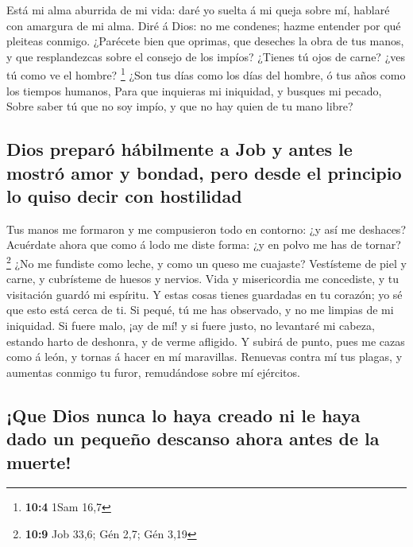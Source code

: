  Está mi alma aburrida de mi vida: daré yo suelta á mi queja
sobre mí, hablaré con amargura de mi alma.  Diré á Dios: no
me condenes; hazme entender por qué pleiteas conmigo. 
¿Parécete bien que oprimas, que deseches la obra de tus manos, y que
resplandezcas sobre el consejo de los impíos?  ¿Tienes tú
ojos de carne? ¿ves tú como ve el hombre? \footnote{\textbf{10:4} 1Sam
  16,7}  ¿Son tus días como los días del hombre, ó tus años
como los tiempos humanos,  Para que inquieras mi iniquidad,
y busques mi pecado,  Sobre saber tú que no soy impío, y que
no hay quien de tu mano libre?

\hypertarget{dios-preparuxf3-huxe1bilmente-a-job-y-antes-le-mostruxf3-amor-y-bondad-pero-desde-el-principio-lo-quiso-decir-con-hostilidad}{%
\subsection{Dios preparó hábilmente a Job y antes le mostró amor y
bondad, pero desde el principio lo quiso decir con
hostilidad}\label{dios-preparuxf3-huxe1bilmente-a-job-y-antes-le-mostruxf3-amor-y-bondad-pero-desde-el-principio-lo-quiso-decir-con-hostilidad}}

 Tus manos me formaron y me compusieron todo en contorno: ¿y
así me deshaces?  Acuérdate ahora que como á lodo me diste
forma: ¿y en polvo me has de tornar? \footnote{\textbf{10:9} Job 33,6;
  Gén 2,7; Gén 3,19}  ¿No me fundiste como leche, y como un
queso me cuajaste?  Vestísteme de piel y carne, y
cubrísteme de huesos y nervios.  Vida y misericordia me
concediste, y tu visitación guardó mi espíritu.  Y estas
cosas tienes guardadas en tu corazón; yo sé que esto está cerca de ti.
 Si pequé, tú me has observado, y no me limpias de mi
iniquidad.  Si fuere malo, ¡ay de mí! y si fuere justo, no
levantaré mi cabeza, estando harto de deshonra, y de verme afligido.
 Y subirá de punto, pues me cazas como á león, y tornas á
hacer en mí maravillas.  Renuevas contra mí tus plagas, y
aumentas conmigo tu furor, remudándose sobre mí ejércitos.

\hypertarget{que-dios-nunca-lo-haya-creado-ni-le-haya-dado-un-pequeuxf1o-descanso-ahora-antes-de-la-muerte}{%
\subsection{¡Que Dios nunca lo haya creado ni le haya dado un pequeño
descanso ahora antes de la
muerte!}\label{que-dios-nunca-lo-haya-creado-ni-le-haya-dado-un-pequeuxf1o-descanso-ahora-antes-de-la-muerte}}

